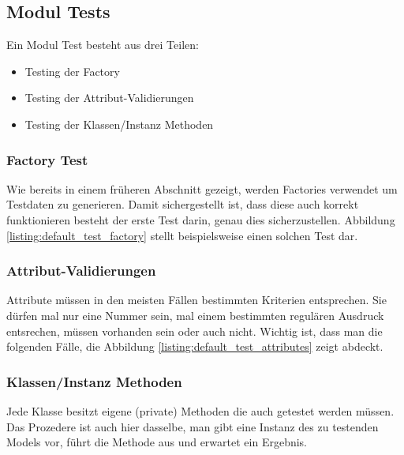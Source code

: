 \documentclass[12pt,             %
               a4paper,          %
               listof=totoc,     %
               index=totoc,      %
               bibliography=totoc,%
               oneside,         %
               BCOR1cm,          %
               english   %
               ]{scrbook}
\begin{document}
\subsection{Modul Tests}
Ein Modul Test besteht aus drei Teilen:
\begin{itemize}
     \item{Testing der Factory}
     \item{Testing der Attribut-Validierungen}
     \item{Testing der Klassen/Instanz Methoden}
\end{itemize}

\subsubsection{Factory Test}
Wie bereits in einem früheren Abschnitt gezeigt, werden Factories verwendet um Testdaten zu generieren. Damit sichergestellt ist, dass diese auch korrekt funktionieren besteht der erste Test darin, genau dies sicherzustellen. Abbildung \vref{listing:default_test_factory} stellt beispielsweise einen solchen Test dar.

\label{listing:default_test_factory}

\subsubsection{Attribut-Validierungen}
Attribute müssen in den meisten Fällen bestimmten Kriterien entsprechen. Sie dürfen mal nur eine Nummer sein, mal einem bestimmten regulären Ausdruck entsrechen, müssen vorhanden sein oder auch nicht. Wichtig ist, dass man die folgenden Fälle, die Abbildung \vref{listing:default_test_attributes} zeigt abdeckt.

\label{listing:default_test_attributes}

\subsubsection{Klassen/Instanz Methoden}
Jede Klasse besitzt eigene (private) Methoden die auch getestet werden müssen. Das Prozedere ist auch hier dasselbe, man gibt eine Instanz des zu testenden Models vor, führt die Methode aus und erwartet ein Ergebnis.
\end{document}
